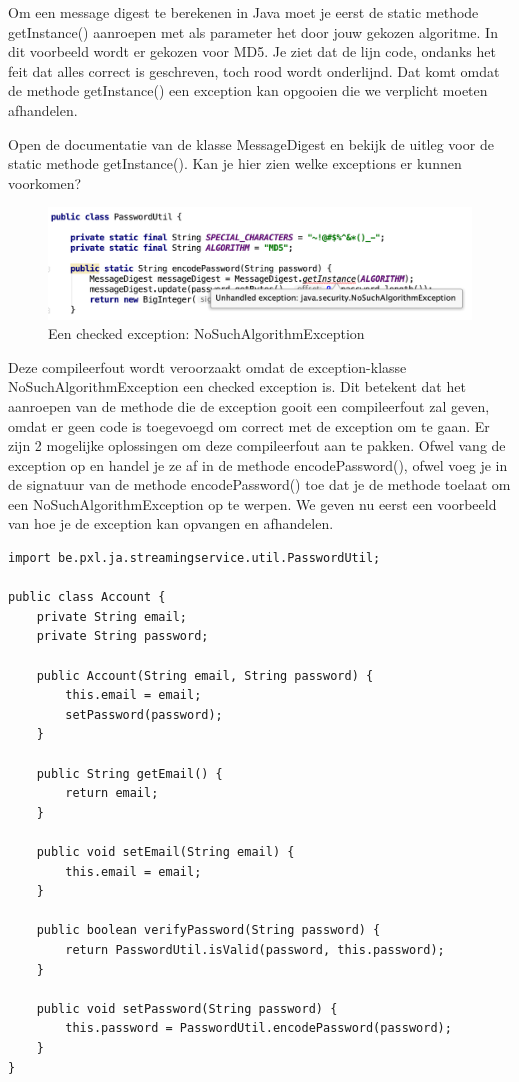 Om een message digest te berekenen in Java moet je eerst de static methode getInstance() aanroepen met als parameter het door jouw gekozen algoritme. In dit voorbeeld wordt er gekozen voor MD5. Je ziet dat de lijn code, ondanks het feit dat alles correct is geschreven, toch rood wordt onderlijnd. Dat komt omdat de methode getInstance() een exception kan opgooien die we verplicht moeten afhandelen.

\begin{oefening}
Open de documentatie van de klasse MessageDigest en bekijk de uitleg voor de static methode getInstance(). Kan je hier zien welke exceptions er kunnen voorkomen?
\end{oefening}

\begin{figure}[H]
\includegraphics[width=\linewidth]{images/h2/no_such_algorithm_exception.png}
\caption{Een checked exception: NoSuchAlgorithmException}
\label{fig:no_such_algorithm}
\end{figure}

Deze compileerfout wordt veroorzaakt omdat de exception-klasse NoSuchAlgorithmException een checked exception is. Dit betekent dat het aanroepen van de methode die de exception gooit een compileerfout zal geven, omdat er geen code is toegevoegd om correct met de  exception om te gaan.
Er zijn 2 mogelijke oplossingen om deze compileerfout aan te pakken. Ofwel vang de exception op en handel je ze af in de methode encodePassword(), ofwel voeg je in de signatuur van de methode encodePassword() toe dat je de methode toelaat om een NoSuchAlgorithmException op te werpen. We geven nu eerst een voorbeeld van hoe je de exception kan opvangen en afhandelen. 

\begin{lstlisting}
import be.pxl.ja.streamingservice.util.PasswordUtil;

public class Account {
	private String email;
	private String password;

	public Account(String email, String password) {
		this.email = email;
		setPassword(password);
	}

	public String getEmail() {
		return email;
	}

	public void setEmail(String email) {
		this.email = email;
	}

	public boolean verifyPassword(String password) {
		return PasswordUtil.isValid(password, this.password);
	}

	public void setPassword(String password) {
		this.password = PasswordUtil.encodePassword(password);
	}
}
\end{lstlisting}

